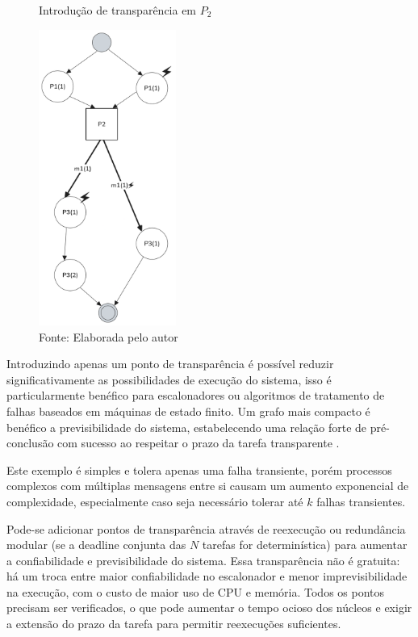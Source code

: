 \begin{figure}[H]
    \centering
	\captionsetup{justification=centering}
    \caption{Introdução de transparência em $P_2$}
    \includegraphics[width=0.40\textwidth]{assets/ftg_transparencia.png}
	\captionsetup{justification=raggedright}
    \caption*{Fonte: Elaborada pelo autor}
    \label{fig:ftgTransparencia}
\end{figure}

Introduzindo apenas um ponto de transparência é possível reduzir significativamente as possibilidades de execução do sistema, isso é particularmente benéfico para escalonadores ou algoritmos de tratamento de falhas baseados em máquinas de estado finito. Um grafo mais compacto é benéfico a previsibilidade do sistema, estabelecendo uma relação forte de pré-conclusão com sucesso ao respeitar o prazo da tarefa transparente \cite{SchedAndOptOfDistributedFT}.

Este exemplo é simples e tolera apenas uma falha transiente, porém processos complexos com múltiplas mensagens entre si causam um aumento exponencial de complexidade, especialmente caso seja necessário tolerar até $k$ falhas transientes.

Pode-se adicionar pontos de transparência através de reexecução ou redundância modular (se a deadline conjunta das $N$ tarefas for determinística) para aumentar a confiabilidade e previsibilidade do sistema. Essa transparência não é gratuita: há um troca entre maior confiabilidade no escalonador e menor imprevisibilidade na execução, com o custo de maior uso de CPU e memória. Todos os pontos precisam ser verificados, o que pode aumentar o tempo ocioso dos núcleos e exigir a extensão do prazo da tarefa para permitir reexecuções suficientes.

